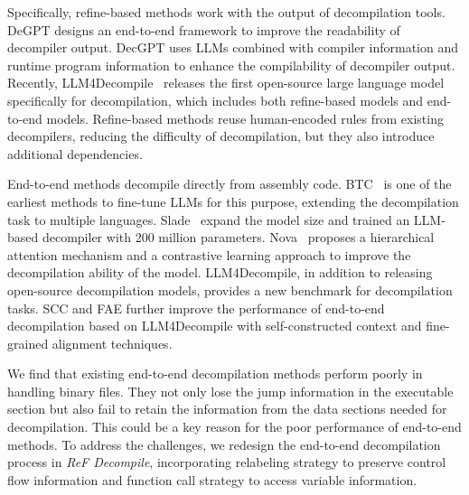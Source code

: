 Specifically, refine-based methods work with the output of decompilation tools.
DeGPT\citep{hu2024degpt} designs an end-to-end framework to improve the readability of decompiler output.
DecGPT\citep{refine_decompile} uses LLMs combined with compiler information and runtime program information to enhance the compilability of decompiler output.
Recently, LLM4Decompile~\citep{llm4decompile} releases the first open-source large language model specifically for decompilation, which includes both refine-based models and end-to-end models.
Refine-based methods reuse human-encoded rules from existing decompilers, reducing the difficulty of decompilation, but they also introduce additional dependencies.

End-to-end methods decompile directly from assembly code.
BTC~\citep{btc} is one of the earliest methods to fine-tune LLMs for this purpose, extending the decompilation task to multiple languages.
Slade~\citep{slade} expand the model size and trained an LLM-based decompiler with 200 million parameters.
Nova~\citep{nova} proposes a hierarchical attention mechanism and a contrastive learning approach to improve the decompilation ability of the model.
LLM4Decompile\citep{llm4decompile}, in addition to releasing open-source decompilation models, provides a new benchmark for decompilation tasks.
SCC and FAE \citep{feng2024self} further improve the performance of end-to-end decompilation based on LLM4Decompile with self-constructed context and fine-grained alignment techniques.

We find that existing end-to-end decompilation methods perform poorly in handling binary files.
They not only lose the jump information in the executable section but also fail to retain the information from the data sections needed for decompilation.
This could be a key reason for the poor performance of end-to-end methods.
To address the challenges, we redesign the end-to-end decompilation process in \textit{ReF Decompile}, incorporating relabeling strategy to preserve control flow information and function call strategy to access variable information.
